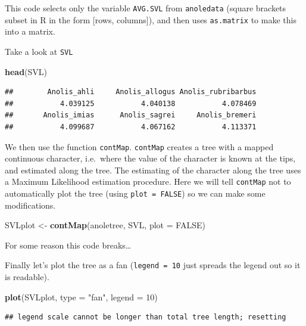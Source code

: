 \documentclass[]{book}
\newenvironment{Shaded}{\begin{snugshade}}{\end{snugshade}}
\newcommand{\KeywordTok}[1]{\textcolor[rgb]{0.13,0.29,0.53}{\textbf{{#1}}}}
\newcommand{\DataTypeTok}[1]{\textcolor[rgb]{0.13,0.29,0.53}{{#1}}}
\newcommand{\DecValTok}[1]{\textcolor[rgb]{0.00,0.00,0.81}{{#1}}}
\newcommand{\StringTok}[1]{\textcolor[rgb]{0.31,0.60,0.02}{{#1}}}
\newcommand{\OtherTok}[1]{\textcolor[rgb]{0.56,0.35,0.01}{{#1}}}
\newcommand{\NormalTok}[1]{{#1}}
\begin{document}
This code selects only the variable \texttt{AVG.SVL} from
\texttt{anoledata} (square brackets subset in R in the form {[}rows,
columns{]}), and then uses \texttt{as.matrix} to make this into a
matrix.

Take a look at \texttt{SVL}

\begin{Shaded}
\begin{Highlighting}[]
\KeywordTok{head}\NormalTok{(SVL)}
\end{Highlighting}
\end{Shaded}

\begin{verbatim}
##        Anolis_ahli     Anolis_allogus Anolis_rubribarbus 
##           4.039125           4.040138           4.078469 
##       Anolis_imias      Anolis_sagrei     Anolis_bremeri 
##           4.099687           4.067162           4.113371
\end{verbatim}

We then use the function \texttt{contMap}. \texttt{contMap} creates a
tree with a mapped continuous character, i.e.~where the value of the
character is known at the tips, and estimated along the tree. The
estimating of the character along the tree uses a Maximum Likelihood
estimation procedure. Here we will tell \texttt{contMap} not to
automatically plot the tree (using \texttt{plot\ =\ FALSE}) so we can
make some modifications.

\begin{Shaded}
\begin{Highlighting}[]
\NormalTok{SVLplot <-}\StringTok{ }\KeywordTok{contMap}\NormalTok{(anoletree, SVL, }\DataTypeTok{plot =} \OtherTok{FALSE}\NormalTok{)}
\end{Highlighting}
\end{Shaded}

For some reason this code breaks\ldots{}

Finally let's plot the tree as a fan (\texttt{legend\ =\ 10} just
spreads the legend out so it is readable).

\begin{Shaded}
\begin{Highlighting}[]
\KeywordTok{plot}\NormalTok{(SVLplot, }\DataTypeTok{type =} \StringTok{"fan"}\NormalTok{, }\DataTypeTok{legend =} \DecValTok{10}\NormalTok{)}
\end{Highlighting}
\end{Shaded}

\begin{verbatim}
## legend scale cannot be longer than total tree length; resetting
\end{verbatim}
\end{document}
